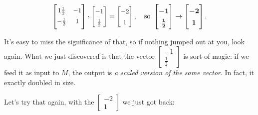 
\vspace{-.2in}
\begin{align*}
\renewcommand*{\arraystretch}{1.4}
\small
\begin{bmatrix}
1\frac{1}{2} & -1 \\
\smallskip
-\frac{1}{2} & 1 \\
\end{bmatrix} \cdot
\begin{bmatrix}
-1 \\ \frac{1}{2} \\
\end{bmatrix} =
\begin{bmatrix}
-2 \\ 1 \\
\end{bmatrix}, \normalsize \quad \textrm{so}\
\boldmath
\begin{bmatrix}
-1 \\ \frac{1}{2} \\
\end{bmatrix} \rightarrow
\begin{bmatrix}
-2 \\ 1 \\
\end{bmatrix}.
\unboldmath
\end{align*}

It's easy to miss the significance of that, so if nothing jumped out at you,
look again. What we just discovered is that the vector {\footnotesize
$\begin{bmatrix} -1 \\ \frac{1}{2} \end{bmatrix}$} is sort of magic: if we feed
it as input to $M$, the output is \textit{a scaled version of the same vector}.
In fact, it exactly doubled in size.

\smallskip

Let's try that again, with the {\footnotesize $\begin{bmatrix} -2 \\ 1
\end{bmatrix}$} we just got back:

